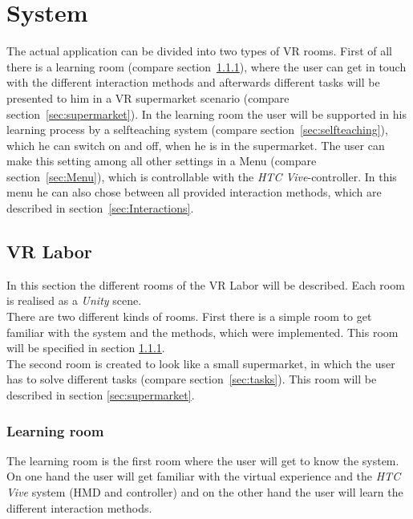 
\section{System}\label{sec:System}
The actual application can be divided into two types of VR rooms. First of all there is a learning room (compare section~\ref{sec:Learningroom}), where the user can get in touch with the different interaction methods and afterwards different tasks will be presented to him in a VR supermarket scenario (compare section~\ref{sec:supermarket}). In the learning room the user will be supported in his learning process by a selfteaching system (compare section~\ref{sec:selfteaching}), which he can switch on and off, when he is in the supermarket. The user can make this setting among all other settings in a Menu  (compare section~\ref{sec:Menu}), which is controllable with the \textit{HTC Vive}-controller. In this menu he can also chose between all provided interaction methods, which are described in section~\ref{sec:Interactions}.

\subsection{VR Labor}\label{sec:VRLabor}
In this section the different rooms of the VR Labor will be described. Each room is realised as a \textit{Unity} scene.\\
There are two different kinds of rooms. First there is a simple room to get familiar with the system and the methods, which were implemented. This room will be specified in  section \ref{sec:Learningroom}.\\
The second room is created to look like a small supermarket, in which the user has to solve different tasks (compare section~\ref{sec:tasks}). This room will be described in section \ref{sec:supermarket}.

\subsubsection{Learning room} \label{sec:Learningroom}
The learning room is the first room where the user will get to know the system. On one hand the user will get familiar with the virtual experience and the \textit{HTC Vive} system (HMD and controller) and on the other hand the user will learn the different interaction methods. 

